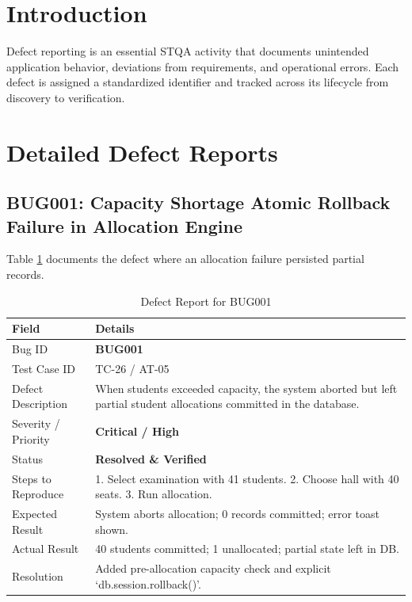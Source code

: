 \documentclass{InternshipReport}
\begin{document}
\section{Introduction}
Defect reporting is an essential STQA activity that documents unintended application behavior, deviations from requirements, and operational errors. Each defect is assigned a standardized identifier and tracked across its lifecycle from discovery to verification.

\section{Detailed Defect Reports}

\subsection{BUG001: Capacity Shortage Atomic Rollback Failure in Allocation Engine}
Table \ref{tab:bug001} documents the defect where an allocation failure persisted partial records.

\begin{table}[H]
\centering
\small
\caption{Defect Report for BUG001}
\label{tab:bug001}
\begin{tabular}{p{} p{}}
\toprule
\textbf{Field} & \textbf{Details} \\
\midrule
Bug ID & \textbf{BUG001} \\
Test Case ID & TC-26 / AT-05 \\
Defect Description & When students exceeded capacity, the system aborted but left partial student allocations committed in the database. \\
Severity / Priority & \textbf{Critical / High} \\
Status & \textbf{Resolved \& Verified} \\
Steps to Reproduce & 1. Select examination with 41 students. 2. Choose hall with 40 seats. 3. Run allocation. \\
Expected Result & System aborts allocation; 0 records committed; error toast shown. \\
Actual Result & 40 students committed; 1 unallocated; partial state left in DB. \\
Resolution & Added pre-allocation capacity check and explicit `db.session.rollback()'. \\
\bottomrule
\end{tabular}
\end{table}
\end{document}
